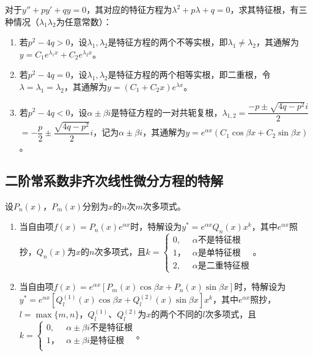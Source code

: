 \documentclass[UTF8, 12pt]{ctexart}
\begin{document}
对于$y''+py'+qy=0$，其对应的特征方程为$\lambda^2+p\lambda+q=0$，求其特征根，有三种情况（$\lambda_1\lambda_2$为任意常数）：

\begin{enumerate}
    \item 若$p^2-4q>0$，设$\lambda_1,\lambda_2$是特征方程的两个不等实根，即$\lambda_1\neq\lambda_2$，其通解为$y=C_1e^{\lambda_1x}+C_2e^{\lambda_2x}$。
    \item 若$p^2-4q=0$，设$\lambda_1,\lambda_2$是特征方程的两个相等实根，即二重根，令$\lambda=\lambda_1=\lambda_2$，其通解为$y=(C_1+C_2x)e^{\lambda x}$。
    \item 若$p^2-4q<0$，设$\alpha\pm\beta i$是特征方程的一对共轭复根，$\lambda_{1,2}=\dfrac{-p\pm\sqrt{4q-p^2}i}{2}$\\$=-\dfrac{p}{2}\pm\dfrac{\sqrt{4q-p^2}}{2}i$，记为$\alpha\pm\beta i$，其通解为$y=e^{\alpha x}(C_1\cos\beta x+C_2\sin\beta x)$。
\end{enumerate}

\subsection{二阶常系数非齐次线性微分方程的特解}

设$P_n(x)$，$P_m(x)$分别为$x$的$n$次$m$次多项式。

\begin{enumerate}
    \item 当自由项$f(x)=P_n(x)e^{\alpha x}$时，特解设为$y^*=e^{\alpha x}Q_n(x)x^k$，其中$e^{\alpha x}$照抄，$Q_n(x)$为$x$的$n$次多项式，且$k=\left\{\begin{array}{ll}
        0, & \alpha\text{不是特征根} \\
        1， & \alpha\text{是单特征根} \\
        2, & \alpha\text{是二重特征根}
    \end{array}\right.$。
    \item 当自由项$f(x)=e^{\alpha x}[P_m(x)\cos\beta x+P_n(x)\sin\beta x]$时，特解设为$y^*=e^{\alpha x}[Q_l^{(1)}(x)\cos\beta x+Q_l^{(2)}(x)\sin\beta x]x^k$，其中$e^{\alpha x}$照抄，$l=\max\{m,n\}$，$Q_l^{(1)}$、$Q_l^{(2)}$为$x$的两个不同的$l$次多项式，且$k=\left\{\begin{array}{ll}
        0, & \alpha\pm\beta i\text{不是特征根} \\
        1， & \alpha\pm\beta i\text{是特征根} \\
    \end{array}\right.$。
\end{enumerate}
\end{document}
